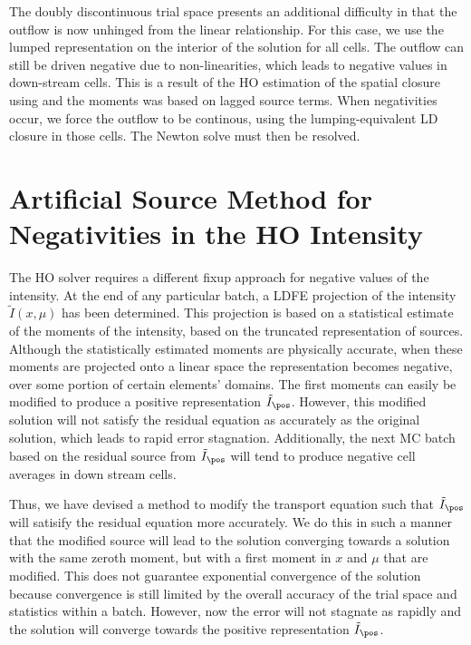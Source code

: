 The doubly discontinuous trial space presents an additional difficulty in that the outflow
is now unhinged from the linear relationship.  For this case, we use the lumped
representation on the interior of the solution for all cells. The outflow can still be driven negative
due to non-linearities, which leads to negative values in down-stream cells. 
This is a result of the HO estimation of the spatial closure using
and the moments was based on lagged source terms.  When negativities occur, we force the
outflow to be continous, using the lumping-equivalent LD closure in those cells.  The
Newton solve must then be resolved.


\section{Artificial Source Method for Negativities in the HO Intensity}

The HO solver requires a different fixup approach for negative values of the intensity.
At the end of any particular batch, a LDFE projection of the intensity $\tilde I(x,\mu)$
has been determined.  This projection is based on a statistical estimate of the moments of the
intensity, based on the truncated representation of sources.  Although the statistically estimated moments are 
physically accurate, when these moments are
projected onto a linear space the representation becomes negative, over some portion of certain elements' domains.  The first
moments can easily be modified to produce a positive representation $\tilde I_{\pos}$.
However, this modified solution will
not satisfy the residual equation as accurately as the original solution, which leads to
rapid error stagnation.  Additionally, the next MC batch based on the residual source from
$\tilde I_{\pos}$ will tend to produce negative cell averages in down stream cells.

Thus, we have devised
a method to modify the transport equation such that $\tilde I_{\pos}$ will satisify the
residual equation more accurately.  We do this in such a manner that the
modified source will lead to the solution converging towards a solution with the same
zeroth moment, but with a first moment in $x$ and $\mu$ that are modified.  This does not
guarantee exponential convergence of the solution because convergence is still limited by
the overall accuracy of the trial space and statistics within a batch.  However, now the error will not stagnate as rapidly
and the solution will converge towards the positive representation $\tilde I_{\pos}$.

